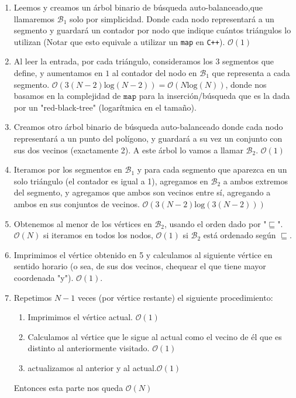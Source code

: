 \begin{enumerate}
	\item Leemos y creamos un árbol binario de búsqueda auto-balanceado,que llamaremos $\mathcal{B}_1$ solo por simplicidad. Donde cada nodo representará a un segmento y guardará un contador por nodo que indique cuántos triángulos lo utilizan (Notar que esto equivale a utilizar un \texttt{map} en \texttt{C++}). $\mathcal{O}(1)$
	
	\item Al leer la entrada, por cada triángulo, consideramos los 3 segmentos que define, y aumentamos en $1$ al contador del nodo en $\mathcal{B}_1$ que representa a cada segmento.  $\mathcal{O}(3(N-2) \text{log}(N-2)) = \mathcal{O}(N \text{log}(N))$, donde nos basamos en la complejidad de $\texttt{map}$ para la inserción/búsqueda que es la dada por un "red-black-tree" (logarítmica en el tamaño).
	\item Creamos otro árbol binario de búsqueda auto-balanceado donde cada nodo representará a un punto del polígono, y guardará a su vez un conjunto con sus dos vecinos (exactamente 2). A este árbol lo vamos a llamar $\mathcal{B}_2$. $\mathcal{O}(1)$
	\item Iteramos por los segmentos en $\mathcal{B}_1$ y para cada segmento que aparezca en un solo triángulo (el contador es igual a 1), agregamos en $\mathcal{B}_2$ a ambos extremos del segmento, y agregamos que ambos son vecinos entre sí, agregando a ambos en sus conjuntos de vecinos. $\mathcal{O}(3(N-2)\text{log}(3(N-2)))$
	\item Obtenemos al menor de los vértices en $\mathcal{B}_2$, usando el orden dado por "$\sqsubseteq$". $\mathcal{O}(N)$ si iteramos en todos los nodos, $\mathcal{O}(1)$ si $\mathcal{B}_2$ está ordenado según $\sqsubseteq$.
	\item Imprimimos el vértice obtenido en 5 y calculamos al siguiente vértice en sentido horario (o sea, de sus dos vecinos, chequear el que tiene mayor coordenada "y"). $\mathcal{O}(1)$.
	\item Repetimos $N-1$ veces (por vértice restante)  el siguiente procedimiento:
	\begin{enumerate}
		\item Imprimimos el vértice actual. $\mathcal{O}(1)$
		\item Calculamos al vértice que le sigue al actual como el vecino de él que es distinto al anteriormente visitado. $\mathcal{O}(1)$
		\item actualizamos al anterior y al actual.$\mathcal{O}(1)$
	\end{enumerate}
	Entonces esta parte nos queda $\mathcal{O}(N)$
\end{enumerate}

